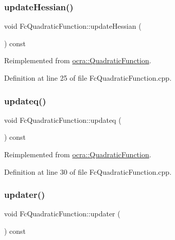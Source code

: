 \subsubsection{\texorpdfstring{update\+Hessian()}{updateHessian()}}
{\footnotesize\ttfamily void Fc\+Quadratic\+Function\+::update\+Hessian (\begin{DoxyParamCaption}{ }\end{DoxyParamCaption}) const\hspace{0.3cm}{\ttfamily [virtual]}}



Reimplemented from \hyperlink{classocra_1_1QuadraticFunction_a342ea525685ddc2c414a49e7480a7a4c}{ocra\+::\+Quadratic\+Function}.



Definition at line 25 of file Fc\+Quadratic\+Function.\+cpp.

\hypertarget{classocra_1_1FcQuadraticFunction_ac6bcfaccbe16a821e0f1d7c29744d138}{}\label{classocra_1_1FcQuadraticFunction_ac6bcfaccbe16a821e0f1d7c29744d138} 
\subsubsection{\texorpdfstring{updateq()}{updateq()}}
{\footnotesize\ttfamily void Fc\+Quadratic\+Function\+::updateq (\begin{DoxyParamCaption}{ }\end{DoxyParamCaption}) const\hspace{0.3cm}{\ttfamily [virtual]}}



Reimplemented from \hyperlink{classocra_1_1QuadraticFunction_ae68e94211c94e8c32da2220132baf248}{ocra\+::\+Quadratic\+Function}.



Definition at line 30 of file Fc\+Quadratic\+Function.\+cpp.

\hypertarget{classocra_1_1FcQuadraticFunction_aab41d4b011590ad42766e66df34305da}{}\label{classocra_1_1FcQuadraticFunction_aab41d4b011590ad42766e66df34305da} 
\subsubsection{\texorpdfstring{updater()}{updater()}}
{\footnotesize\ttfamily void Fc\+Quadratic\+Function\+::updater (\begin{DoxyParamCaption}{ }\end{DoxyParamCaption}) const\hspace{0.3cm}{\ttfamily [virtual]}}



